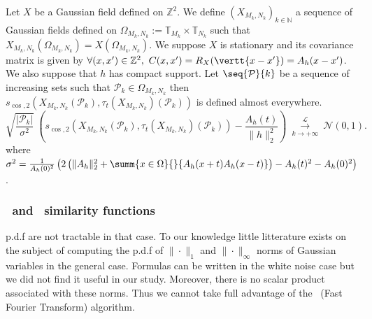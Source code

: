 \begin{prop}
  Let $X$ be a Gaussian field defined on $\mathbb{Z}^2$. We define
  $\left(X_{M_k,N_k}\right)_{k \in \mathbb{N}}$ a sequence of Gaussian fields
  defined on $\Omega_{M_k,N_k} := \mathbb{T}_{M_k} \times \mathbb{T}_{N_k}$ such
  that $X_{M_k,N_k}(\Omega_{M_k,N_k}) = X(\Omega_{M_k,N_k})$. We suppose $X$ is
  stationary and its covariance matrix is given by
  $\forall (x,x') \in \mathbb{Z}^2, \ C(x,x') = R_X(\vertt{x-x'}) = A_h(x-x')$. We
  also suppose that $h$ has compact support. Let $\seq{\mathcal{P}}{k}$ be a
  sequence of increasing sets such that $\mathcal{P}_k \in \Omega_{M_k,N_k}$
  then
  $s_{\cos,2}(X_{M_k,N_k}(\mathcal{P}_k),
  \tau_t\left(X_{M_k,N_k}\right)(\mathcal{P}_k))$ is defined almost everywhere.
  \[
    \sqrt{\frac{\vert \mathcal{P}_k \vert}{\sigma^2}} \
    \left(s_{\cos,2}(X_{M_k,N_k}(\mathcal{P}_k), \tau_t
    \left(X_{M_k,N_k}\right)(\mathcal{P}_k)) - \frac{A_h(t)}{\| h\|_2^2} \right) \ \overset{\mathcal{L}}{\underset{k
        \rightarrow +\infty}{\longrightarrow}} \ \mathcal{N}(0,1).
  \]
  where
  $\sigma^2 = \frac{1}{A_h(0)^2}\left(2 \left(\|A_h\|_2^2 + \summ{x \in
      \Omega}{}{A_h(x+t)A_h(x-t)}\right) - A_h(t)^2 - A_h(0)^2\right)$.
  \label{p:angle_pdf}
\end{prop}

\subsubsection{ \ and \s{\infty} \ similarity functions} p.d.f are not
tractable in that case. To our knowledge little litterature exists on the
subject of computing the p.d.f of $\|\cdot\|_1$ and $\|\cdot\|_{\infty}$ norms
of Gaussian variables in the general case. Formulas can be written in the white
noise case but we did not find it useful in our study. Moreover, there is no
scalar product associated with these norms. Thus we cannot take full advantage
of the \FFT \ (Fast Fourier Transform) algorithm.\\
